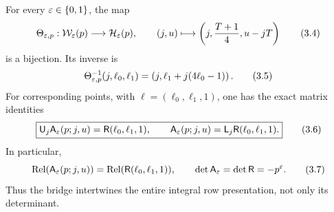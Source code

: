 \begin{theorem}\label{thm:esksb-bridge}
For every \(\varepsilon\in\{0,1\}\), the map
\begin{equation}
 \Theta_{\varepsilon,p}:\mathcal W_\varepsilon(p)\longrightarrow\mathcal H_\varepsilon(p),
 \qquad
 (j,u)\longmapsto
 \left(j,\frac{T+1}{4},u-jT\right)                          \tag{3.4}
\end{equation}
is a bijection.  Its inverse is
\begin{equation}
 \Theta_{\varepsilon,p}^{-1}(j,\ell_0,\ell_1)
 =\left(j,\ell_1+j(4\ell_0-1)\right).                       \tag{3.5}
\end{equation}
For corresponding points, with
\(\ell=(\ell_0,\ell_1,1)\), one has the exact matrix identities
\begin{equation}
 \boxed{
 \mathsf U_j\mathsf A_\varepsilon(p;j,u)
 =\mathsf R(\ell_0,\ell_1,1),
 \qquad
 \mathsf A_\varepsilon(p;j,u)
 =\mathsf L_j\mathsf R(\ell_0,\ell_1,1).}                  \tag{3.6}
\end{equation}
In particular,
\begin{equation}
 \operatorname{Rel}(\mathsf A_\varepsilon(p;j,u))
 =\operatorname{Rel}(\mathsf R(\ell_0,\ell_1,1)),
 \qquad
 \det\mathsf A_\varepsilon=\det\mathsf R=-p^\varepsilon.                \tag{3.7}
\end{equation}
Thus the bridge intertwines the entire integral row presentation, not only
its determinant.
\end{theorem}

